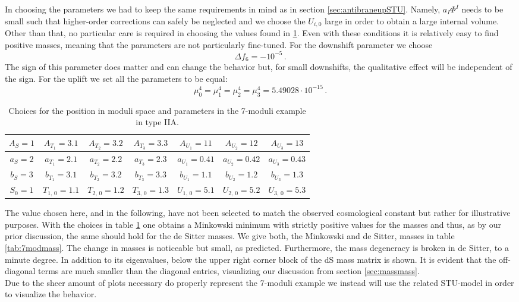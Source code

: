 \documentclass[a4paper,12pt]{report}
\newcommand{\be}{\begin{equation}}
\newcommand{\ee}{\end{equation}}
\begin{document}
In choosing the parameters we had to keep the same requirements in mind as in section \ref{sec:antibraneupSTU}.  Namely, $a_I \Phi^I$ needs to be small such that higher-order corrections can safely be neglected and we choose the $U_{i,0}$ large in order to obtain a large internal volume. Other than that, no particular care is required in choosing the values found in \ref{tab:7modchoice}. Even with these conditions it is relatively easy to find positive masses, meaning that the parameters are not particularly fine-tuned. For the downshift parameter we choose 
\be 
\Delta f_6 = -10^{-5}\,.
\ee 
The sign of this parameter does matter and can change the behavior but, for small downshifts, the qualitative effect will be independent of the sign. For the uplift we set all the parameters to be equal:
\be 
\mu_0 ^4 = \mu_1 ^4 = \mu_2 ^4 = \mu_3 ^4 = 5.49028 \cdot 10^{-15}\,.
\ee
\begin{table}[H]
\centering
\begin{tabular}{|c|c|c|c|c|c|c|}\hline
$A_S = 1$ & $A_{T_1} = 3.1$& $A_{T_2} = 3.2$& $A_{T_3} = 3.3$ & $A_{U_1} =11$& $A_{U_2} =12$& $A_{U_3} =13$\\\hline
$a_S = 2$ & $a_{T_1} = 2.1$& $a_{T_2} = 2.2$& $a_{T_3} = 2.3$ & $a_{U_1} =0.41$& $a_{U_2} =0.42$& $a_{U_3} =0.43$\\\hline
$b_S = 3$ & $b_{T_1} = 3.1$& $b_{T_2} = 3.2$& $b_{T_3} = 3.3$ & $b_{U_1} =1.1$& $b_{U_2} =1.2$& $b_{U_3} =1.3$\\\hline
$S_0 = 1$ & $T_{1,\,0} = 1.1$  & $T_{2,\,0} = 1.2$  & $T_{3,\,0} = 1.3$ & $U_{1,\,0} = 5.1$& $U_{2,\,0} = 5.2$& $U_{3,\,0} = 5.3$\\\hline
\end{tabular}
\caption{Choices for the position in moduli space and parameters in the 7-moduli example in type IIA.}
\label{tab:7modchoice}
\end{table}
The value chosen here, and in the following, have not been selected to match the observed cosmological constant but rather for illustrative purposes. With the choices in table \ref{tab:7modchoice} one obtains a Minkowski minimum with strictly positive values for the masses and thus, as by our prior discussion, the same should hold for the de Sitter masses. We give both, the Minkowski and de Sitter, masses in table \ref{tab:7modmass}. The change in masses is noticeable but small, as predicted. Furthermore, the mass degeneracy is  broken in de Sitter, to a minute degree. In addition to its eigenvalues, below the upper right corner block of the dS mass matrix is shown. It is evident that the off-diagonal terms are much smaller than the diagonal entries, visualizing our discussion from section \ref{sec:massmass}.\\
Due to the sheer amount of plots necessary do properly represent the 7-moduli example we instead will use the related STU-model in order  to visualize the behavior.
\end{document}
